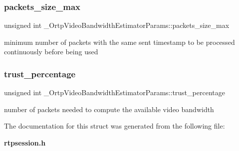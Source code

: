 \subsubsection{packets\+\_\+size\+\_\+max}
{\footnotesize\ttfamily unsigned int \+\_\+\+Ortp\+Video\+Bandwidth\+Estimator\+Params\+::packets\+\_\+size\+\_\+max}

minimum number of packets with the same sent timestamp to be processed continuously before being used \mbox{\label{struct__OrtpVideoBandwidthEstimatorParams_a2b25af1580c889143d028327171f8b12}} 
\subsubsection{trust\+\_\+percentage}
{\footnotesize\ttfamily unsigned int \+\_\+\+Ortp\+Video\+Bandwidth\+Estimator\+Params\+::trust\+\_\+percentage}

number of packets needed to compute the available video bandwidth 

The documentation for this struct was generated from the following file\+:\begin{DoxyCompactItemize}
\item 
\textbf{ rtpsession.\+h}\end{DoxyCompactItemize}
